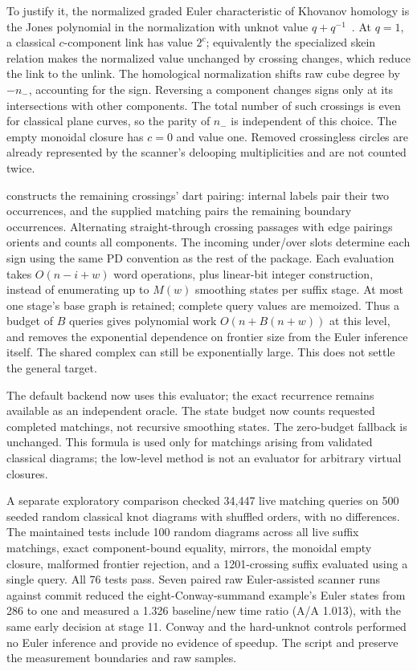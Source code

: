 To justify it, the normalized graded Euler characteristic of Khovanov
homology is the Jones polynomial in the normalization with unknot value
$q+q^{-1}$~\cite{khovanov}. At $q=1$, a classical $c$-component link has
value $2^c$; equivalently the specialized skein relation makes the
normalized value unchanged by crossing changes, which reduce the link
to the unlink. The homological normalization shifts raw cube degree by
$-n_-$, accounting for the sign. Reversing a component changes signs
only at its intersections with other components. The total number of
such crossings is even for classical plane curves, so the parity of
$n_-$ is independent of this choice. The empty monoidal closure has
$c=0$ and value one. Removed crossingless circles are already represented
by the scanner's delooping multiplicities and are not counted twice.

 constructs the remaining crossings' dart pairing:
internal labels pair their two occurrences, and the supplied matching
pairs the remaining boundary occurrences. Alternating straight-through
crossing passages with edge pairings orients and counts all components.
The incoming under/over slots determine each sign using the same PD
convention as the rest of the package. Each evaluation takes
$O(n-i+w)$ word operations, plus linear-bit integer construction, instead
of enumerating up to $M(w)$ smoothing states per suffix stage. At most
one stage's base graph is retained; complete query values are memoized.
Thus a budget of $B$ queries gives polynomial work
$O(n+B(n+w))$ at this level, and removes the exponential dependence on
frontier size from the Euler inference itself. The shared complex can
still be exponentially large. This does not settle the general target.

The default  backend now uses this evaluator; the exact
 recurrence remains available as an independent oracle.
The state budget now counts requested completed matchings, not recursive
smoothing states. The zero-budget fallback is unchanged. This formula is
used only for matchings arising from validated classical diagrams; the
low-level method is not an evaluator for arbitrary virtual closures.

A separate exploratory comparison checked 34,447 live matching queries
on 500 seeded random classical knot diagrams with shuffled orders, with
no differences. The maintained tests include 100 random diagrams across
all live suffix matchings, exact component-bound equality, mirrors, the
monoidal empty closure, malformed frontier rejection, and a 1201-crossing
suffix evaluated using a single query. All 76 tests pass. Seven paired
raw Euler-assisted scanner runs against commit  reduced
the eight-Conway-summand example's Euler states from 286 to one and
measured a 1.326 baseline/new time ratio (A/A 1.013), with the same early
decision at stage 11. Conway and the hard-unknot controls performed no
Euler inference and provide no evidence of speedup. The script
 and
 preserve the
measurement boundaries and raw samples.

